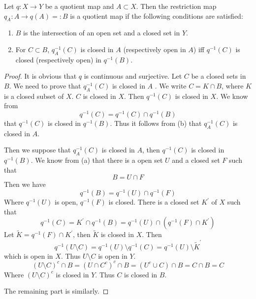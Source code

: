 \documentclass[../main.tex]{subfiles}
\begin{document}
\begin{theorem}{}{}
Let $q : X \to Y$ be a quotient map and $A \subset X$. Then the restriction map $q_A : A \to q(A) =: B$ is a quotient map if the following conditions are satisfied:
\begin{enumerate}
\item[(a)] $B$ is the intersection of an open set and a closed set in $Y$.
\item[(b)] For $C \subset B$, $q_A^{-1}(C)$ is closed in $A$ (respectively open in $A$) iff $q^{-1}(C)$ is closed (respectively open) in $q^{-1}(B)$.
\end{enumerate}
\end{theorem}

\begin{proof}
    It is obvious that \(  q  \) is continuous and surjective. 
   Let \(  C  \) be a closed sets in \(  B  \). We need to prove that \(  q_{A}^{-1} \left( C \right)   \) is closed in \(  A  \)    . We write \(  C= K\cap B  \), where \(  K  \) is a closed subset of \(  X  \).   \(  C  \) is closed in \(  X  \). Then \(  q^{-1} \left( C \right)    \) is closed in \(   X  \).    We know from \[
   q^{-1} \left( C \right)=  q^{-1} \left( C \right)\cap q^{-1} \left( B \right)   
   \] that \(  q^{-1} \left( C \right)    \) is closed in \(  q^{-1} \left( B \right)   \).   Thus it follows from (b) that \(  q_{A}^{-1} \left( C \right)   \) is closed in \(  A  \).   
   
    Then we suppose that \(  q_{A}^{-1} \left( C \right)   \) is closed in \(  A  \), then \(  q^{-1} \left( C \right)    \) is closed in \(  q^{-1} \left( B \right)   \).    We know from (a) that there is a open set \(  U  \) and a closed set \(  F  \) such that \[
   B= U\cap F
   \]  Then we have \[
   q^{-1} \left( B \right)=  q^{-1} \left( U \right)\cap  q ^{-1} \left( F \right)   
   \]Where \(  q^{-1} \left( U \right)   \) is open, \(  q^{-1} \left( F \right)   \) is closed.   There is a closed set \(  K^{\prime}   \) of \(  X  \) such that \[
   q^{-1} \left( C \right)= K^{\prime} \cap q^{-1} \left( B \right)=  q^{-1} \left( U \right)\cap \left( q^{-1} \left( F \right)\cap K^{\prime}   \right)    
   \]  Let \(  \tilde{K}=  q^{-1} \left( F \right)\cap K^{\prime}    \), then \(  \tilde{K}  \) is closed in \(  X  \).   Then \[
   q^{-1} \left( U\setminus C \right)=  q ^{-1} \left( U \right)\setminus   q ^{-1} \left( C \right)=  q ^{-1} \left( U \right)\setminus \tilde{K}^{\prime}     
   \] which is open in \(  X  \). Thus \(  U\setminus C  \) is open in \(  Y  \).    \[
   \left( U\setminus C \right)^{c}\cap B= \left( U\cap C^{c} \right)^{c}\cap B= \left( U^{c}\cup C \right) \cap B = C\cap B= C
   \]Where \(  \left( U\setminus C \right)^{c}   \) is closed in \(  Y  \). Thus \(  C  \) is closed in \(  B  \).
   
   The remaining part is similarly.

\end{proof}
\end{document}

